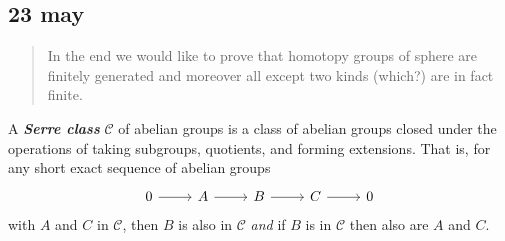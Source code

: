 \documentclass{article}
\newcommand{\Cc}{\mathcal{C}}
\begin{document}
\subsection{23 may}
\begin{quotation}
	In the end we would like to prove that homotopy groups of sphere are finitely generated and moreover all except two kinds ({\color{magenta}which}?) are in fact finite.
\end{quotation}

\begin{defn}
	A \textbf{\textit{Serre class}} $\Cc$ of abelian groups is a class of abelian groups closed under the operations of taking subgroups, quotients, and forming extensions. That is, for any short exact sequence of abelian groups
	\[\begin{tikzcd}
		0\arrow[r]&A\arrow[r]&B\arrow[r]&C\arrow[r]&0
	\end{tikzcd}\]
	with $A$ and $C$ in $\Cc$, then $B$ is also in $\Cc$ \textit{and} if $B$ is in $\mathcal{C}$ then also are $A$ and $C$.
\end{defn}
\end{document}
